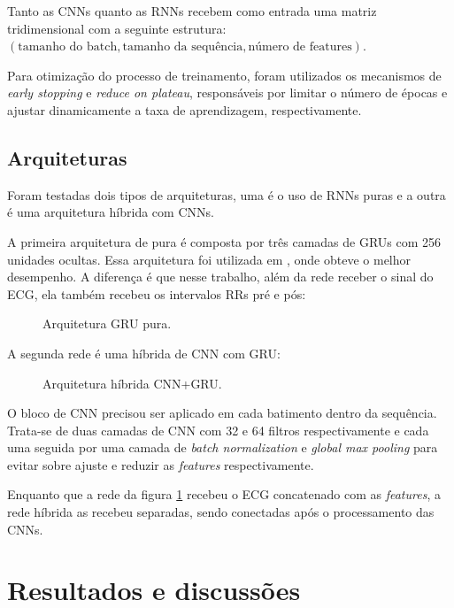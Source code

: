 \documentclass[
    12pt,                %
    openright,           %
    oneside,             %
    a4paper,             %
    brazil               %
]{abntex2}
\begin{document}
Tanto as CNNs quanto as RNNs recebem como entrada uma matriz tridimensional com a seguinte estrutura: $(\text{tamanho do batch}, \text{tamanho da sequência}, \text{número de features})$.

Para otimização do processo de treinamento, foram utilizados os mecanismos de \textit{early stopping} e \textit{reduce on plateau}, responsáveis por limitar o número de épocas e ajustar dinamicamente a taxa de aprendizagem, respectivamente.

\section{Arquiteturas}
\label{sec:modelos}

Foram testadas dois tipos de arquiteturas, uma é o uso de RNNs puras e a outra é uma arquitetura híbrida com CNNs. 

A primeira arquitetura de pura é composta por três camadas de GRUs com 256 unidades ocultas. Essa arquitetura foi utilizada em , onde obteve o melhor desempenho. 
A diferença é que nesse trabalho, além da rede receber o sinal do ECG, ela também recebeu os intervalos RRs pré e pós:


\begin{figure}[H]
  \centering
  \caption{Arquitetura GRU pura.}
  \label{fig:gru_pura}
\end{figure}

A segunda rede é uma híbrida de CNN com GRU:

\begin{figure}[H]
  \centering
  \caption{Arquitetura híbrida CNN+GRU.}
  \label{fig:cnn_gru}
\end{figure}

O bloco de CNN precisou ser aplicado em cada batimento dentro da sequência. Trata-se de duas camadas de CNN com 32 e 64 filtros respectivamente e cada 
uma seguida por uma camada de \textit{batch normalization} e \textit{global max pooling} para evitar sobre ajuste e reduzir as \textit{features} respectivamente.

Enquanto que a rede da figura \ref{fig:gru_pura} recebeu o ECG concatenado com as \textit{features}, a rede híbrida as recebeu separadas, sendo conectadas após o processamento
das CNNs.

\chapter{Resultados e discussões}
\end{document}
